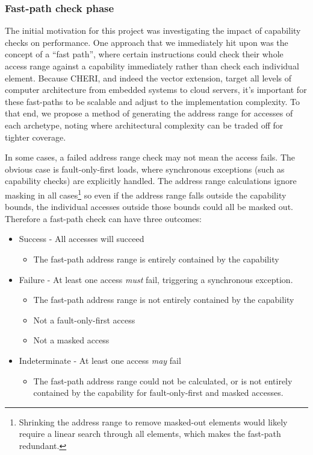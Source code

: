 \subsubsection{Fast-path check phase}
The initial motivation for this project was investigating the impact of capability checks on performance.
One approach that we immediately hit upon was the concept of a \enquote{fast path}, where certain instructions could check their whole access range against a capability immediately rather than check each individual element.
Because CHERI, and indeed the vector extension, target all levels of computer architecture from embedded systems to cloud servers, it's important for these fast-paths to be scalable and adjust to the implementation complexity.
To that end, we propose a method of generating the address range for accesses of each archetype, noting where architectural complexity can be traded off for tighter coverage.

In some cases, a failed address range check may not mean the access fails.
The obvious case is fault-only-first loads, where synchronous exceptions (such as capability checks) are explicitly handled.
The address range calculations ignore masking in all cases\footnote{Shrinking the address range to remove masked-out elements would likely require a linear search through all elements, which makes the fast-path redundant.} so even if the address range falls outside the capability bounds, the individual accesses outside those bounds could all be masked out.
Therefore a fast-path check can have three outcomes:
\begin{itemize}
    \item Success - All accesses will succeed
    \begin{itemize}
        \item The fast-path address range is entirely contained by the capability
    \end{itemize}
    \item Failure - At least one access \emph{must} fail, triggering a synchronous exception.
    \begin{itemize}
        \item The fast-path address range is not entirely contained by the capability
        \item Not a fault-only-first access
        \item Not a masked access
    \end{itemize}
    \item Indeterminate - At least one access \emph{may} fail
    \begin{itemize}
        \item The fast-path address range could not be calculated, or is not entirely contained by the capability for fault-only-first and masked accesses.
    \end{itemize}
\end{itemize}

